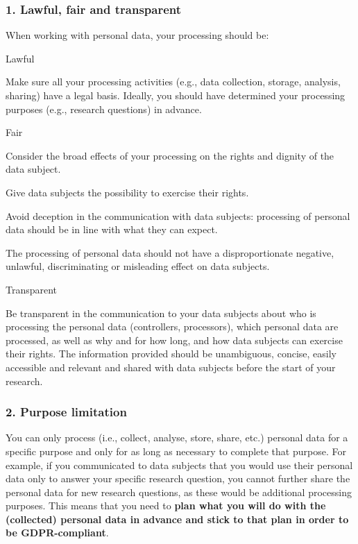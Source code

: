 \documentclass[
]{book}
\begin{document}
\hypertarget{lawful-fair-and-transparent}{%
\subsubsection{1. Lawful, fair and transparent}\label{lawful-fair-and-transparent}}

When working with personal data, your processing should be:

Lawful

Make sure all your processing activities (e.g., data collection, storage,
analysis, sharing) have a legal basis. Ideally,
you should have determined your processing purposes (e.g., research questions)
in advance.

Fair

Consider the broad effects of your processing on the rights and dignity of the data subject.

Give data subjects the possibility to exercise their rights.

Avoid deception in the communication with data subjects: processing of personal data should be in line with what they can expect.

The processing of personal data should not have a disproportionate negative, unlawful, discriminating or misleading effect on data subjects.

Transparent

Be transparent in the communication to your data subjects
about who is processing the personal data (controllers, processors), which
personal data are processed, as well as why and for how long, and how data
subjects can exercise their rights. The information provided should be
unambiguous, concise, easily accessible and relevant and shared with data
subjects before the start of your research.

\hypertarget{purpose-limitation}{%
\subsubsection{2. Purpose limitation}\label{purpose-limitation}}

You can only process (i.e., collect, analyse, store, share, etc.) personal data
for a specific purpose and only for as long as necessary to complete that purpose.
For example, if you communicated to data subjects that you would use their
personal data only to answer your specific research question, you cannot further
share the personal data for new research questions, as these would be additional
processing purposes. This means that you need to \textbf{plan what you will do with
the (collected) personal data in advance and stick to that plan in order to be
GDPR-compliant}.
\end{document}
